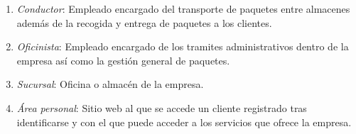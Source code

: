 \begin{enumerate}
		\item \textit{Conductor}: Empleado encargado del transporte de paquetes entre almacenes además de la recogida y entrega de paquetes a los clientes.	
		\item \textit{Oficinista}: Empleado encargado de los tramites administrativos dentro de la empresa así como la gestión general de paquetes.
		\item \textit{Sucursal}: Oficina o almacén de la empresa.
		\item \textit{Área personal}: Sitio web al que se accede un cliente registrado tras identificarse y con el que puede acceder a los servicios que ofrece la empresa.
 	\end{enumerate}
\newpage


